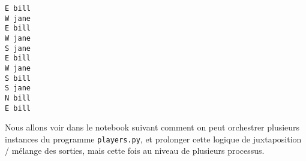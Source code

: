     \begin{Verbatim}[commandchars=\\\{\}]
E bill
W jane
E bill
W jane
S jane
E bill
W jane
S bill
S jane
N bill
E bill

    \end{Verbatim}

    Nous allons voir dans le notebook suivant comment on peut orchestrer
plusieurs instances du programme \texttt{players.py}, et prolonger cette
logique de juxtaposition / mélange des sorties, mais cette fois au
niveau de plusieurs processus.


    
    
    
